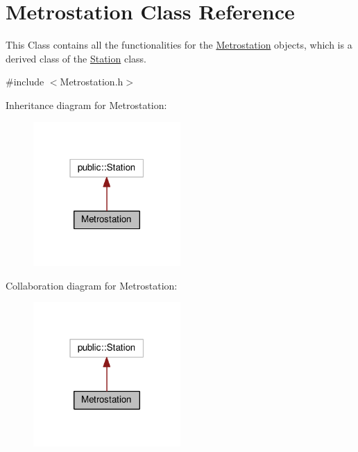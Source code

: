 \hypertarget{classMetrostation}{}\section{Metrostation Class Reference}
\label{classMetrostation}


This Class contains all the functionalities for the \hyperlink{classMetrostation}{Metrostation} objects, which is a derived class of the \hyperlink{classStation}{Station} class.  




{\ttfamily \#include $<$Metrostation.\+h$>$}



Inheritance diagram for Metrostation\+:\nopagebreak
\begin{figure}[H]
\begin{center}
\leavevmode
\includegraphics[width=159pt]{classMetrostation__inherit__graph}
\end{center}
\end{figure}


Collaboration diagram for Metrostation\+:\nopagebreak
\begin{figure}[H]
\begin{center}
\leavevmode
\includegraphics[width=159pt]{classMetrostation__coll__graph}
\end{center}
\end{figure}
